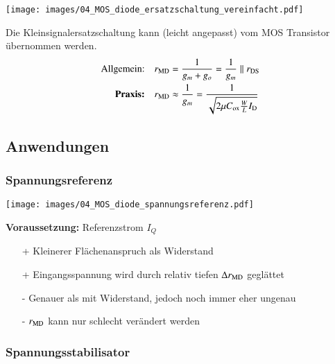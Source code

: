 \begin{minipage}[t]{0.3\columnwidth}
    \texttt{[image: images/04\_MOS\_diode\_ersatzschaltung\_vereinfacht.pdf]}
\end{minipage}
\hfill
\begin{minipage}[t]{0.65\columnwidth}
    Die Kleinsignalersatzschaltung kann (leicht angepasst) vom MOS Transistor übernommen werden.
    \begin{align*}
        \text{Allgemein:} \quad             r_\text{\rm MD}  &= \frac{1}{g_m + g_o} = \frac{1}{g_m} \parallel r_{\rm DS} \\
        \text{\textbf{Praxis:}} \quad       r_\text{\rm MD} &\approx \frac{1}{g_m} = \frac{1}{\sqrt{2 \mu C_\text{ox} \frac{W}{L} I_\text{D}}}
    \end{align*}

\end{minipage}


\subsection{Anwendungen}

\subsubsection{Spannungsreferenz}
\label{Spannungsreferenz}

\begin{minipage}[t]{0.44\columnwidth}
    \texttt{[image: images/04\_MOS\_diode\_spannungsreferenz.pdf]}
\end{minipage}
\hfill
\begin{minipage}[t]{0.52\columnwidth}
    \textbf{Voraussetzung: } Referenzstrom $I_Q$
    \smallskip

    \begin{itemize}
        \item[+] Kleinerer Flächenanspruch als Widerstand
        \item[+] Eingangsspannung wird durch relativ tiefen $\Delta r_{\rm MD}$ geglättet
        \item[-] Genauer als mit Widerstand, jedoch noch immer eher ungenau
        \item[-] $r_{\rm MD}$ kann nur schlecht verändert werden
    \end{itemize}
\end{minipage}


\subsubsection{Spannungsstabilisator}

